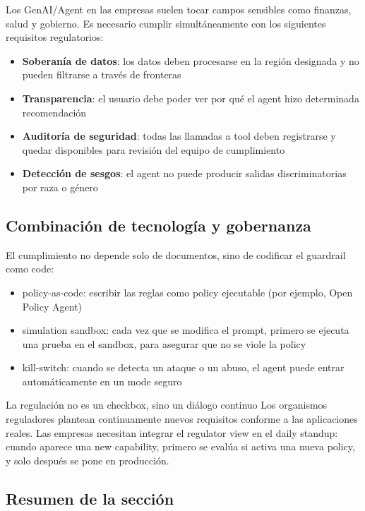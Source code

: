 \documentclass[a4paper]{article}
\begin{document}
Los GenAI/Agent en las empresas suelen tocar campos sensibles como finanzas, salud y gobierno. Es necesario cumplir simultáneamente con los siguientes requisitos regulatorios:

\begin{itemize}
    \item \textbf{Soberanía de datos}: los datos deben procesarse en la región designada y no pueden filtrarse a través de fronteras
    \item \textbf{Transparencia}: el usuario debe poder ver por qué el agent hizo determinada recomendación
    \item \textbf{Auditoría de seguridad}: todas las llamadas a tool deben registrarse y quedar disponibles para revisión del equipo de cumplimiento
    \item \textbf{Detección de sesgos}: el agent no puede producir salidas discriminatorias por raza o género
\end{itemize}

\subsection{Combinación de tecnología y gobernanza}

El cumplimiento no depende solo de documentos, sino de codificar el guardrail como code:

\begin{itemize}
    \item policy-as-code: escribir las reglas como policy ejecutable (por ejemplo, Open Policy Agent)
    \item simulation sandbox: cada vez que se modifica el prompt, primero se ejecuta una prueba en el sandbox, para asegurar que no se viole la policy
    \item kill-switch: cuando se detecta un ataque o un abuso, el agent puede entrar automáticamente en un mode seguro
\end{itemize}

\begin{warningbox}{La regulación no es un checkbox, sino un diálogo continuo}
Los organismos reguladores plantean continuamente nuevos requisitos conforme a las aplicaciones reales. Las empresas necesitan integrar el regulator view en el daily standup: cuando aparece una new capability, primero se evalúa si activa una nueva policy, y solo después se pone en producción.
\end{warningbox}

\subsection{Resumen de la sección}
\end{document}
